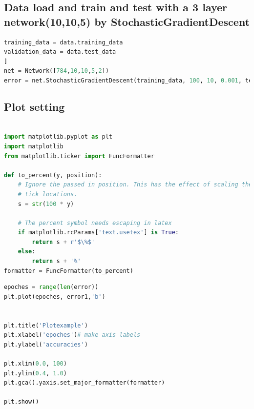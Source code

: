 \documentclass[12pt,a4paper]{article}
\begin{document}
\subsection{Data load and train and test with a 3 layer network(10,10,5) by StochasticGradientDescent}
\begin{lstlisting}[language=Python]
training_data = data.training_data
validation_data = data.test_data
]
net = Network([784,10,10,5,2])
error = net.StochasticGradientDescent(training_data, 100, 10, 0.001, test_data=validation_data)

\end{lstlisting}
\subsection{Plot setting}
\begin{lstlisting}[language=Python]
%matplotlib inline

import matplotlib.pyplot as plt
import matplotlib
from matplotlib.ticker import FuncFormatter

def to_percent(y, position):
    # Ignore the passed in position. This has the effect of scaling the default
    # tick locations.
    s = str(100 * y)

    # The percent symbol needs escaping in latex
    if matplotlib.rcParams['text.usetex'] is True:
        return s + r'$\%$'
    else:
        return s + '%'
formatter = FuncFormatter(to_percent)
\end{lstlisting}
\begin{lstlisting}[language=Python]
epoches = range(len(error))
plt.plot(epoches, error1,'b')


plt.title('Plotexample')
plt.xlabel('epoches')# make axis labels
plt.ylabel('accuracies')

plt.xlim(0.0, 100)
plt.ylim(0.4, 1.0)
plt.gca().yaxis.set_major_formatter(formatter)

plt.show()
\end{lstlisting}
\end{document}
